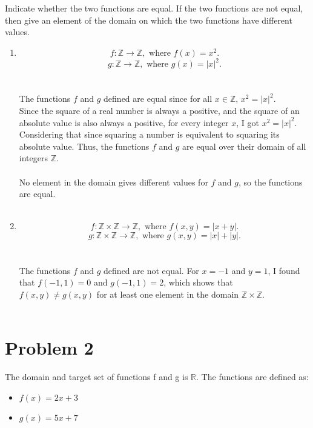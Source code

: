 \documentclass{amsart}
\theoremstyle{definition}
\theoremstyle{Exercise}
\theoremstyle{remark}
\theoremstyle{rule}
\numberwithin{equation}{section}
\newcommand{\Z}{\mathbb Z}
\begin{document}
Indicate whether the two functions are equal. If the two functions are not equal, then give an element of the domain on which the two functions have different values.\\
 \begin{enumerate}[label=(\alph*)]
   \item
\[ f: \Z \to \Z, \text{ where } f(x)= x^2.\]
\[ g: \Z \to \Z, \text{ where } g(x)= |x|^2.\]\\\\
The functions \( f \) and \( g \) defined are equal since for all \( x \in \mathbb{Z} \), \( x^2 = |x|^2 \).\\
Since the square of a real number is always a positive, and the square of an absolute value is also always a positive, for every integer $x$, I got $x^2 = |x|^2$. Considering that since squaring a number is equivalent to squaring its absolute value. Thus, the functions $f$ and $g$ are equal over their domain of all integers $\mathbb{Z}$.
\\\\
No element in the domain gives different values for $f$ and $g$, so the functions are equal.
\\\\
\item  \[ f: \Z\times \Z \to \Z, \text{ where } f(x,y)= |x+y|.\]
\[ g: \Z\times \Z \to \Z, \text{ where } g(x,y)= |x|+|y|.\]\\\\
The functions \( f \) and \( g \) defined are not equal. For \( x = -1 \) and \( y = 1 \), I found that \( f(-1,1) = 0 \) and \( g(-1,1) = 2 \), which shows that \( f(x,y) \neq g(x,y) \) for at least one element in the domain \( \mathbb{Z} \times \mathbb{Z} \).
\\\\
\end{enumerate}

 \newpage

\section*{Problem 2}

The domain and target set of functions f and g is $\mathbb{R}$. The functions are defined as:
\begin{itemize}
  \item $f(x) = 2x + 3$\\

  \item $g(x) = 5x + 7$\\


\end{itemize}
\end{document}
